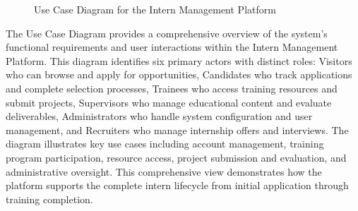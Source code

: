 \begin{figure}[H]
    \centering
    \caption{Use Case Diagram for the Intern Management Platform}
    \label{fig:use_case_diagram}
\end{figure}

\noindent
The Use Case Diagram provides a comprehensive overview of the system's functional requirements and user interactions within the Intern Management Platform. This diagram identifies six primary actors with distinct roles: Visitors who can browse and apply for opportunities, Candidates who track applications and complete selection processes, Trainees who access training resources and submit projects, Supervisors who manage educational content and evaluate deliverables, Administrators who handle system configuration and user management, and Recruiters who manage internship offers and interviews. The diagram illustrates key use cases including account management, training program participation, resource access, project submission and evaluation, and administrative oversight. This comprehensive view demonstrates how the platform supports the complete intern lifecycle from initial application through training completion.

